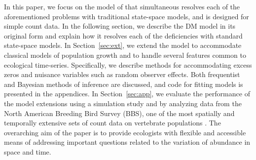 \documentclass[12pt]{article}
\begin{document}
In this paper, we focus on the model of \citet[henceforth the DM model]{dail_madsen:2011}
that simultaneous resolves each of the aforementioned problems with
traditional state-space models, and is designed for simple count data.
In the following section, we describe the DM model in its original
form and explain how it resolves each of the deficiencies with
standard state-space models. In Section~\ref{sec:ext}, we extend the
model to accommodate classical models of population growth and
to handle several features common to ecological
time-series. Specifically, we describe methods for accommodating
excess zeros and nuisance variables such as random observer effects.
Both frequentist and Bayesian methods of inference are discussed, and
code for fitting models is presented in the appendices.
In Section~\ref{sec:app}, we evaluate the performance of the model
extensions using a simulation study and by analyzing data from the
North American Breeding Bird Survey (BBS), one of
the most spatially and temporally extensive sets of count data on
vertebrate populations \citep{robbins_etal:1986}. The overarching aim
of the paper is to provide ecologists with flexible and accessible means of
addressing important questions related to the variation of abundance in
space and time. 
\end{document}
